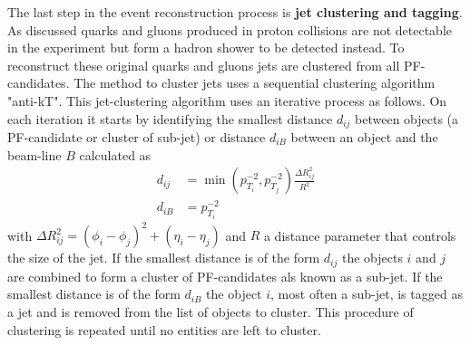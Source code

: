 The last step in the event reconstruction process is \textbf{jet clustering and tagging}. As discussed quarks and gluons produced in proton collisions are not detectable in the experiment but form a hadron shower to be detected instead. To reconstruct these original quarks and gluons jets are clustered from all PF-candidates. The method to cluster jets uses a sequential clustering algorithm "anti-kT"\cite{Cacciari_2008}. This jet-clustering algorithm uses an iterative process as follows. On each iteration it starts by identifying the smallest distance $d_{ij}$ between objects (a PF-candidate or cluster of sub-jet) or distance $d_{iB}$ between an object and the beam-line $B$ calculated as
\begin{align}
    d_{ij} &= \min(p_{T_i}^{-2},p_{T_j}^{-2}) \frac{\Delta R^2_{ij}}{R^2} \\
    d_{iB} &= p_{T_i}^{-2}
\end{align}
with $\Delta R^2_{ij} = (\phi_i-\phi_j)^2+(\eta_i-\eta_j)$ and $R$ a distance parameter that controls the size of the jet. If the smallest distance is of the form $d_{ij}$ the objects $i$ and $j$ are combined to form a cluster of PF-candidates als known as a sub-jet. If the smallest distance is of the form $d_{iB}$ the object $i$, most often a sub-jet, is tagged as a jet and is removed from the list of objects to cluster. This procedure of clustering is repeated until no entities are left to cluster. \\
\\
